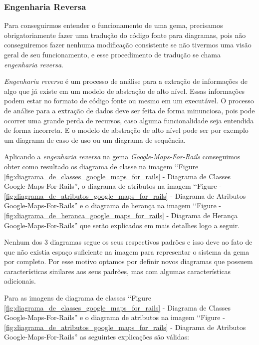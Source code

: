 \subsubsection{Engenharia Reversa}
\label{engenharia_reversa}

Para conseguirmos entender o funcionamento de uma gema, precisamos obrigatoriamente fazer uma tradução
do código fonte para diagramas, pois não conseguiremos fazer nenhuma modificação consistente
se não tivermos uma visão geral de seu funcionamento, e esse procedimento de tradução se chama 
\emph{engenharia reversa}.

\emph{Engenharia reversa} é um processo de análise para a extração de informações de algo que já 
existe em um modelo de abstração de alto nível. Essas informações podem estar no formato de código 
fonte ou mesmo em um executável. O processo de análise para a extração de dados deve ser feita de forma
minunciosa, pois pode ocorrer uma grande perda de recursos, caso alguma funcionalidade seja entendida de
forma incorreta. E o modelo de abstração de alto nível pode ser por exemplo um diagrama de caso de uso ou
um diagrama de sequência.

Aplicando a \emph{engenharia reversa} na gema \emph{Google-Maps-For-Rails} conseguimos obter como resultado
os diagrama de classe na imagem ‘‘Figure \ref{fig:diagrama_de_classes_google_maps_for_rails} - Diagrama de 
Classes Google-Maps-For-Rails'', o diagrama de atributos na imagem ‘‘Figure - 
\ref{fig:diagrama_de_atributos_google_maps_for_rails} - Diagrama de Atributos Google-Maps-For-Rails'' e o 
diagrama de herança na imagem ‘‘Figure - \ref{fig:diagrama_de_heranca_google_maps_for_rails} - Diagrama de 
Herança Google-Maps-For-Rails'' que serão explicados em mais detalhes logo a seguir.

Nenhum dos 3 diagramas segue os seus respectivos padrões e isso deve ao fato de que não existia espaço 
suficiente na imagem para representar o sistema da gema por completo. Por esse motivo optamos por definir 
novos diagramas que possuem características sinilares aos seus padrões, mas com algumas características
adicionais.

Para as imagens de diagrama de classes ‘‘Figure \ref{fig:diagrama_de_classes_google_maps_for_rails} - 
Diagrama de Classes Google-Maps-For-Rails'' e o diagrama de atributos na imagem ‘‘Figure - 
\ref{fig:diagrama_de_atributos_google_maps_for_rails} - Diagrama de Atributos Google-Maps-For-Rails''
as seguintes explicações são válidas:

